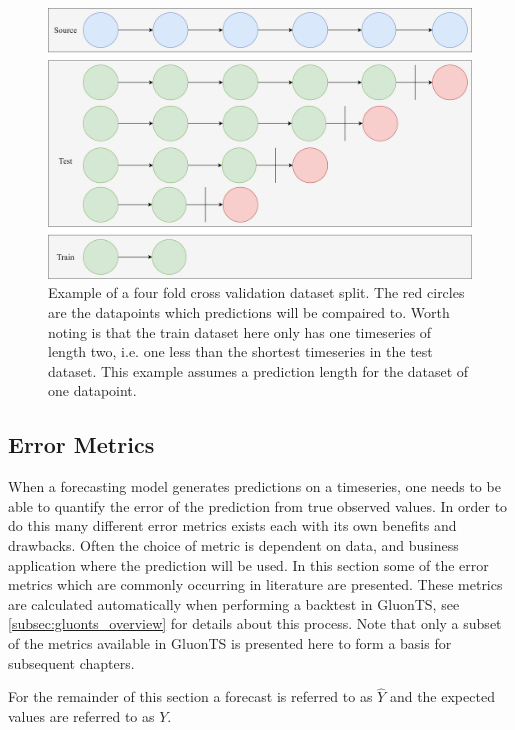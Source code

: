 \begin{figure}[htb]
    \centering
    \includegraphics[width=\linewidth]{./img/k_fold_validation.png}
    \caption{Example of a four fold cross validation dataset split. The red circles are the datapoints which predictions will be compaired to. Worth noting is that the train dataset here only has one timeseries of length two, i.e. one less than the shortest timeseries in the test dataset. This example assumes a prediction length for the dataset of one datapoint.}
    \label{fig:k_fold_validation}
    \endminipage\hfill
\end{figure}


\subsection{Error Metrics}
\label{subsec:error_metrics}
When a forecasting model generates predictions on a timeseries, one needs to be able to quantify the error of the prediction from true observed values. In order to do this many different error metrics exists each with its own benefits and drawbacks. Often the choice of metric is dependent on data, and business application where the prediction will be used. In this section some of the error metrics which are commonly occurring in literature are presented. These metrics are calculated automatically when performing a backtest in GluonTS, see \ref{subsec:gluonts_overview} for details about this process. Note that only a subset of the metrics available in GluonTS is presented here to form a basis for subsequent chapters.

For the remainder of this section a forecast is referred to as \(\hat{Y}\) and the expected values are referred to as \(Y\).

